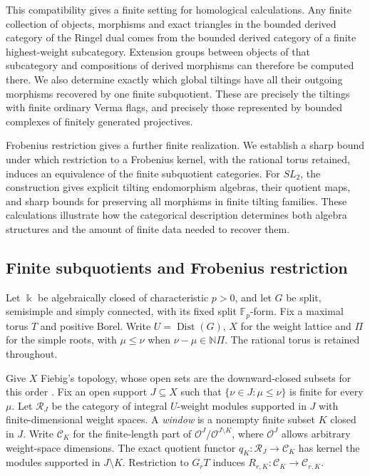 \documentclass[11pt,reqno]{amsart}
\newcommand{\kk}{\Bbbk}\newcommand{\ZZ}{\mathbb Z}\newcommand{\NN}{\mathbb N}
\newcommand{\OO}{\mathcal O}\newcommand{\CC}{\mathscr C}\newcommand{\RR}{\mathcal R}\newcommand{\DD}{\mathcal D}
\newcommand{\Dist}{\operatorname{Dist}}\newcommand{\Ind}{\operatorname{Ind}}\newcommand{\Perf}{\operatorname{Perf}}
\theoremstyle{definition}
\theoremstyle{remark}
\numberwithin{equation}{section}
\begin{document}
This compatibility gives a finite setting for homological calculations.
Any finite collection of objects, morphisms and exact triangles in the
bounded derived category of the Ringel dual comes from the bounded
derived category of a finite highest-weight subcategory. Extension
groups between objects of that subcategory and compositions of derived
morphisms can therefore be computed there.
We also determine exactly which global tiltings have all their
outgoing morphisms recovered by one finite subquotient. These are
precisely the tiltings with finite ordinary Verma flags, and precisely
those represented by bounded complexes of finitely generated
projectives.

Frobenius restriction gives a further finite realization. We establish
a sharp bound under which restriction to a Frobenius kernel, with the
rational torus retained, induces an equivalence of the finite
subquotient categories. For $SL_2$, the construction gives explicit
tilting endomorphism algebras, their quotient maps, and sharp bounds
for preserving all morphisms in finite tilting families. These
calculations illustrate how the categorical description determines
both algebra structures and the amount of finite data needed to
recover them.

\subsection{Finite subquotients and Frobenius restriction}
Let $\kk$ be algebraically closed of characteristic $p>0$, and let $G$
be split, semisimple and simply connected, with its fixed split
$\mathbb F_p$-form. Fix a maximal torus
$T$ and positive Borel. Write $U=\Dist(G)$, $X$ for the
weight lattice and $\Pi$ for the simple roots, with
$\mu\leq\nu$ when $\nu-\mu\in\NN\Pi$. The rational torus is retained
throughout.

Give $X$ Fiebig's topology, whose open sets are the downward-closed
subsets for this order \cite[Section~10, Definition~3]{Fiebig}.
Fix an open support $J\subseteq X$ such that
$\{\nu\in J:\mu\leq\nu\}$ is finite for every $\mu$. Let $\RR_J$
be the category of integral $U$-weight modules supported in $J$ with
finite-dimensional weight spaces. A \emph{window} is a nonempty
finite subset $K$ closed in $J$. Write $\CC_K$ for the finite-length
part of $\OO^J/\OO^{J\setminus K}$, where $\OO^J$ allows arbitrary
weight-space dimensions. The exact quotient functor
$q_K:\RR_J\to\CC_K$ has kernel the modules supported in
$J\setminus K$. Restriction to $G_rT$ induces
$R_{r,K}:\CC_K\to\CC_{r,K}$.
\end{document}
